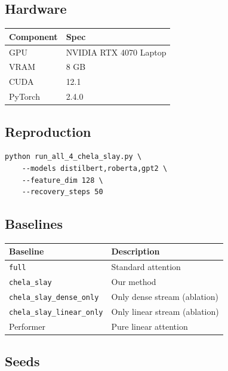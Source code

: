 \subsection{Hardware}

\begin{table}[H]
\centering
\small
\begin{tabular}{ll}
\toprule
\textbf{Component} & \textbf{Spec} \\
\midrule
GPU & NVIDIA RTX 4070 Laptop \\
VRAM & 8 GB \\
CUDA & 12.1 \\
PyTorch & 2.4.0 \\
\bottomrule
\end{tabular}
\end{table}

\subsection{Reproduction}

\begin{lstlisting}
python run_all_4_chela_slay.py \
    --models distilbert,roberta,gpt2 \
    --feature_dim 128 \
    --recovery_steps 50
\end{lstlisting}

\subsection{Baselines}

\begin{table}[H]
\centering
\small
\begin{tabular}{ll}
\toprule
\textbf{Baseline} & \textbf{Description} \\
\midrule
\texttt{full} & Standard attention \\
\texttt{chela\_slay} & Our method \\
\texttt{chela\_slay\_dense\_only} & Only dense stream (ablation) \\
\texttt{chela\_slay\_linear\_only} & Only linear stream (ablation) \\
Performer & Pure linear attention \\
\bottomrule
\end{tabular}
\end{table}

\subsection{Seeds}

